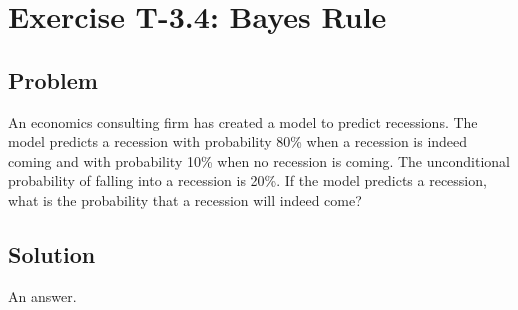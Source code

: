 \section*{Exercise T-3.4: Bayes Rule}

\subsection*{Problem}

An economics consulting firm has created a model to predict recessions. The model predicts a recession with probability 80\% when a recession is indeed coming and with probability 10\% when no recession is coming. The unconditional probability of falling into a recession is 20\%. If the model predicts a recession, what is the probability that a recession will indeed come?

\subsection*{Solution}
An answer.
